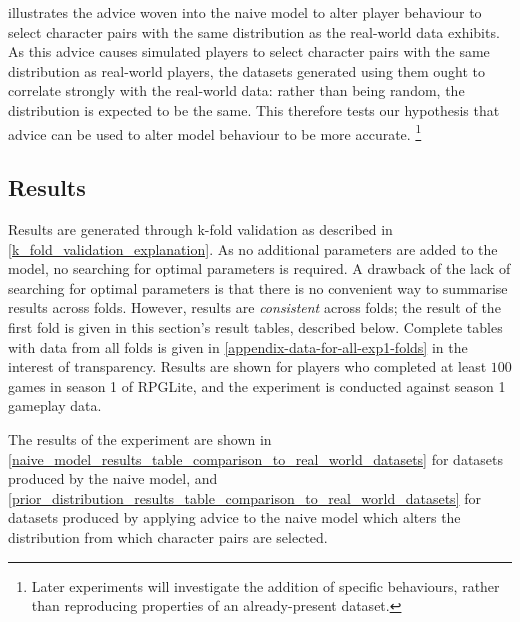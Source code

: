  illustrates the advice woven into the
naive model to alter player behaviour to select character pairs with the same
distribution as the real-world data exhibits. As this advice causes simulated
players to select character pairs with the same distribution as real-world
players, the datasets generated using them ought to correlate strongly with the
real-world data: rather than being random, the distribution is expected to be
the same. This therefore tests our hypothesis that advice can be used to alter
model behaviour to be more accurate.
\footnote{
  Later experiments will investigate the addition of specific behaviours, rather
  than reproducing properties of an already-present dataset.
}


\subsection{Results}

Results are generated through k-fold validation as described in
\cref{k_fold_validation_explanation}. As no additional parameters are added to
the model, no searching for optimal parameters is required. A drawback of the
lack of searching for optimal parameters is that there is no convenient way to
summarise results across folds. However, results are \emph{consistent} across
folds; the result of the first fold is given in this section's result tables,
described below. Complete tables with data from all folds is given in
\cref{appendix-data-for-all-exp1-folds} in the interest of transparency. Results
are shown for players who completed at least $100$ games in season 1 of RPGLite,
and the experiment is conducted against season 1 gameplay data.

The results of the experiment are shown in
\cref{naive_model_results_table_comparison_to_real_world_datasets} for datasets
produced by the naive model, and
\cref{prior_distribution_results_table_comparison_to_real_world_datasets} for
datasets produced by applying advice to the naive model which alters the
distribution from which character pairs are selected. 


